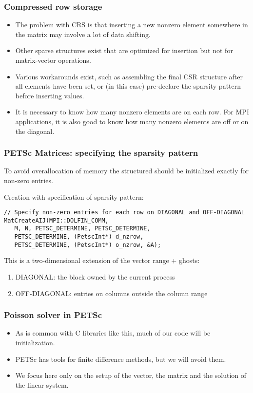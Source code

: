\begin{frame}
  \frametitle{Compressed row storage}
  \begin{itemize}
  \item The problem with CRS is that inserting a new nonzero element somewhere
    in the matrix may involve a lot of data shifting.
  \item Other sparse structures exist that are optimized for insertion but not
    for matrix-vector operations.
  \item Various workarounds exist, such as assembling the final CSR structure
    after all elements have been set, or (in this case) pre-declare the sparsity
    pattern before inserting values.
  \item It is necessary to know how many nonzero elements are on each row. For
    MPI applications, it is also good to know how many nonzero elements are off
    or on the diagonal.
  \end{itemize}
\end{frame}


\begin{frame}[fragile]
  \frametitle{PETSc Matrices: specifying the sparsity pattern}

To avoid overallocation of memory the structured should be initialized exactly for non-zero entries.

\medskip
Creation with specification of sparsity pattern:
\begin{lstlisting}[style=c]
// Specify non-zero entries for each row on DIAGONAL and OFF-DIAGONAL
MatCreateAIJ(MPI::DOLFIN_COMM, 
   M, N, PETSC_DETERMINE, PETSC_DETERMINE,
   PETSC_DETERMINE, (PetscInt*) d_nzrow,
   PETSC_DETERMINE, (PetscInt*) o_nzrow, &A);
\end{lstlisting}


\medskip
This is a two-dimensional extension of the vector range + ghosts:
\begin{enumerate}
\item DIAGONAL: the block owned by the current process
\item OFF-DIAGONAL: entries on columns outside the column range
\end{enumerate}

\end{frame}

\begin{frame}
  \frametitle{Poisson solver in PETSc}
  \begin{itemize}
  \item As is common with C libraries like this, much of our code will be
    initialization.
  \item PETSc has tools for finite difference methods, but we will avoid them.
  \item We focus here only on the setup of the vector, the matrix and the
    solution of the linear system.
  \end{itemize}
\end{frame}


